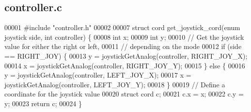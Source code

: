 \subsection{controller.\+c}
\label{a00089_source}

\begin{DoxyCode}
00001 \textcolor{preprocessor}{#include "controller.h"}
00002 
00007 \textcolor{keyword}{struct }cord get_joystick_cord(enum joystick side, int controller) \{
00008   \textcolor{keywordtype}{int} x;
00009   \textcolor{keywordtype}{int} y;
00010   \textcolor{comment}{// Get the joystick value for either the right or left,}
00011   \textcolor{comment}{// depending on the mode}
00012   \textcolor{keywordflow}{if} (side == RIGHT_JOY) \{
00013     y = joystickGetAnalog(controller, RIGHT_JOY_X);
00014     x = joystickGetAnalog(controller, RIGHT_JOY_Y);
00015   \} \textcolor{keywordflow}{else} \{
00016     y = joystickGetAnalog(controller, LEFT_JOY_X);
00017     x = joystickGetAnalog(controller, LEFT_JOY_Y);
00018   \}
00019   \textcolor{comment}{// Define a coordinate for the joystick value}
00020   \textcolor{keyword}{struct }cord c;
00021   c.x = x;
00022   c.y = y;
00023   \textcolor{keywordflow}{return} c;
00024 \}
\end{DoxyCode}
